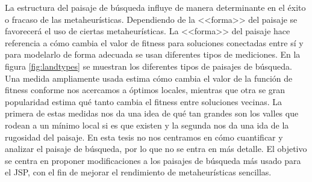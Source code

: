 La estructura del paisaje de búsqueda influye de manera determinante en el éxito o fracaso de las metaheurísticas. 
%
Dependiendo de la <<forma>> del paisaje se favorecerá el uso de ciertas metaheurísticas. 
%
La <<forma>> del paisaje hace referencia a cómo cambia el valor de fitness para soluciones conectadas entre sí y para modelarlo de forma adecuada se usan diferentes
tipos de mediciones. En la figura \ref{fig:landtypes} se muestran los diferentes tipos de paisajes de búsqueda.
%
Una medida ampliamente usada estima cómo cambia el valor de la función de fitness conforme nos acercamos a óptimos locales, mientras que otra se gran popularidad 
estima qué tanto cambia el fitness entre soluciones vecinas\cite{skauffman}. 
%
La primera de estas medidas nos da una idea de qué tan grandes son los valles que rodean a un mínimo local si es que existen y la segunda nos da una ida de la 
rugosidad del paisaje.
%
En esta tesis no nos centramos en cómo cuantificar y analizar el paisaje de búsqueda, por lo que no se entra en más detalle.
%
El objetivo se centra en proponer modificaciones a los paisajes de búsqueda más usado para el JSP, con el fin de mejorar el rendimiento de metaheurísticas sencillas.

